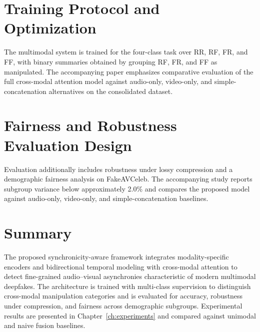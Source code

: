 \section{Training Protocol and Optimization}
The multimodal system is trained for the four-class task over RR, RF, FR, and FF, with binary summaries obtained by grouping RF, FR, and FF as manipulated. The accompanying paper emphasizes comparative evaluation of the full cross-modal attention model against audio-only, video-only, and simple-concatenation alternatives on the consolidated dataset.

\section{Fairness and Robustness Evaluation Design}
Evaluation additionally includes robustness under lossy compression and a demographic fairness analysis on FakeAVCeleb. The accompanying study reports subgroup variance below approximately 2.0\% and compares the proposed model against audio-only, video-only, and simple-concatenation baselines.

\section{Summary}
The proposed synchronicity-aware framework integrates modality-specific encoders and bidirectional temporal modeling with cross-modal attention to detect fine-grained audio–visual asynchronies characteristic of modern multimodal deepfakes. The architecture is trained with multi-class supervision to distinguish cross-modal manipulation categories and is evaluated for accuracy, robustness under compression, and fairness across demographic subgroups. Experimental results are presented in Chapter~\ref{ch:experiments} and compared against unimodal and naive fusion baselines.